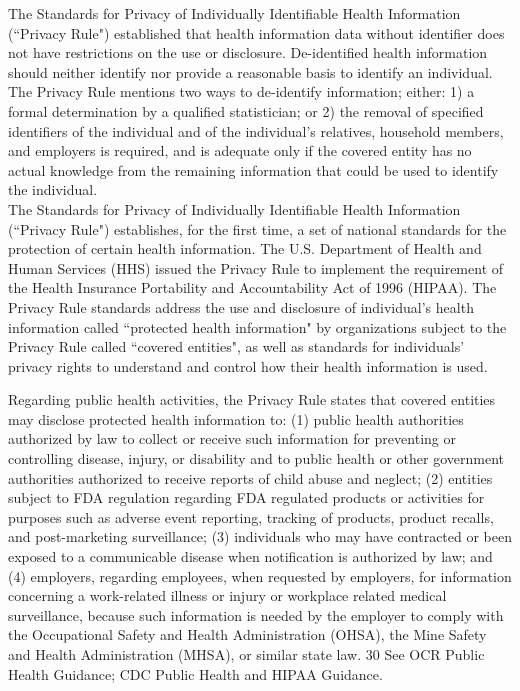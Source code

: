 \documentclass[12pt,letterpaper]{report}
\begin{document}
The Standards for Privacy of Individually Identifiable Health Information (``Privacy Rule") established that health information data without identifier does not have restrictions on the use or disclosure. De-identified health information should neither identify nor provide a reasonable basis to identify an individual. The Privacy Rule mentions two ways to de-identify information; either: 
1) a formal determination by a qualified statistician; or 
2) the removal of specified identifiers of the individual and of the individual's relatives, household members, and employers is required, and is adequate only if the covered entity has no actual knowledge from the remaining information that could be used to identify the individual.
\\The Standards for Privacy of Individually Identifiable Health Information (``Privacy Rule") establishes, for the first time, a set of national standards for the protection of certain health information. The U.S. Department of Health and Human Services (HHS) issued the Privacy Rule to implement the requirement of the Health Insurance Portability and Accountability Act of 1996 (HIPAA). 
The Privacy Rule standards address the use and disclosure of individual's health information called ``protected health information" by organizations subject to the Privacy Rule called ``covered entities", as well as standards for individuals' privacy rights to understand and control how their health information is used. 

Regarding public health activities, the Privacy Rule states that covered entities may disclose protected health information to: 
(1) public health authorities authorized by law to collect or receive such information for preventing or controlling disease, injury, or disability and to public health or other government authorities authorized to receive reports of child abuse and neglect; 
(2) entities subject to FDA regulation regarding FDA regulated products or activities for purposes such as adverse event reporting, tracking of products, product recalls, and post-marketing surveillance; 
(3) individuals who may have contracted or been exposed to a communicable disease when notification is authorized by law; and 
(4) employers, regarding employees, when requested by employers, for information concerning a work-related illness or injury or workplace related medical surveillance, because such information is needed by the employer to comply with the Occupational Safety and Health Administration (OHSA), the Mine Safety and Health Administration (MHSA), or similar state law. 30 See OCR Public Health Guidance; CDC Public Health and HIPAA Guidance.
\end{document}
